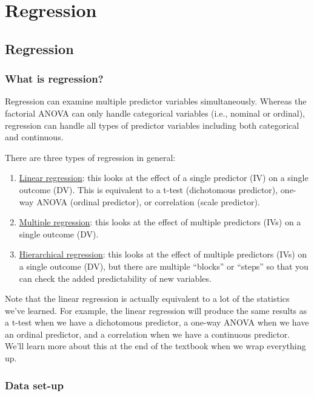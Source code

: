 \documentclass[
]{book}
\begin{document}
\hypertarget{part-regression}{%
\part{Regression}\label{part-regression}}

\hypertarget{regression}{%
\chapter{Regression}\label{regression}}

\hypertarget{what-is-regression}{%
\section{What is regression?}\label{what-is-regression}}

Regression can examine multiple predictor variables simultaneously. Whereas the factorial ANOVA can only handle categorical variables (i.e., nominal or ordinal), regression can handle all types of predictor variables including both categorical and continuous.

There are three types of regression in general:

\begin{enumerate}
\def\labelenumi{\arabic{enumi}.}
\item
  \underline{Linear regression}: this looks at the effect of a single predictor (IV) on a single outcome (DV). This is equivalent to a t-test (dichotomous predictor), one-way ANOVA (ordinal predictor), or correlation (scale predictor).
\item
  \underline{Multiple regression}: this looks at the effect of multiple predictors (IVs) on a single outcome (DV).
\item
  \underline{Hierarchical regression}: this looks at the effect of multiple predictors (IVs) on a single outcome (DV), but there are multiple ``blocks'' or ``steps'' so that you can check the added predictability of new variables.
\end{enumerate}

Note that the linear regression is actually equivalent to a lot of the statistics we've learned. For example, the linear regression will produce the same results as a t-test when we have a dichotomous predictor, a one-way ANOVA when we have an ordinal predictor, and a correlation when we have a continuous predictor. We'll learn more about this at the end of the textbook when we wrap everything up.

\hypertarget{data-set-up-8}{%
\section{Data set-up}\label{data-set-up-8}}
\end{document}
